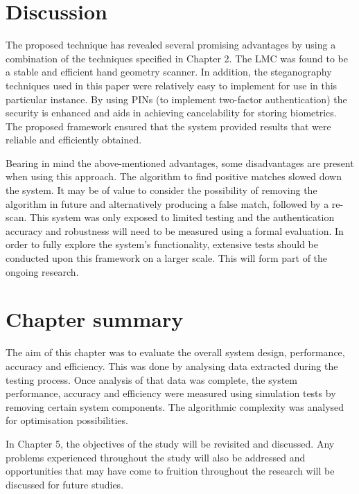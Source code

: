 \section{Discussion}

The proposed technique has revealed several promising advantages by using a combination of the techniques specified in Chapter 2. The LMC was found to be a stable and efficient hand geometry scanner. In addition, the steganography techniques used in this paper were relatively easy to implement for use in this particular instance. By using PINs (to implement two-factor authentication) the security is enhanced and aids in achieving cancelability for storing biometrics. The proposed framework ensured that the system provided results that were reliable and efficiently obtained.

Bearing in mind the above-mentioned advantages, some disadvantages are present when using this approach. The algorithm to find positive matches slowed down the system. It may be of value to consider the possibility of removing the algorithm in future and alternatively producing a false match, followed by a re-scan. This system was only exposed to limited testing and the authentication accuracy and robustness will need to be measured using a formal evaluation. In order to fully explore the system’s functionality, extensive tests should be conducted upon this framework on a larger scale. This will form part of the ongoing research.


\section{Chapter summary}

The aim of this chapter was to evaluate the overall system design, performance, accuracy and efficiency. This was done by analysing data extracted during the testing process. Once analysis of that data was complete, the system performance, accuracy and efficiency were measured using simulation tests by removing certain system components. The algorithmic complexity was analysed for optimisation possibilities.

In Chapter 5, the objectives of the study will be revisited and discussed. Any problems experienced throughout the study will also be addressed and opportunities that may have come to fruition throughout the research will be discussed for future studies.